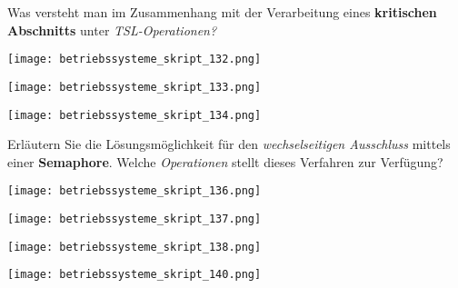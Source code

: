 \documentclass{article}
\begin{document}
\begin{tcolorbox}[colback=white!10!white,colframe=lightgray!75!black,
  savelowerto=\jobname_ex.tex,breakable,enhanced,lines before break=40]

\justifying
Was versteht man im Zusammenhang mit der Verarbeitung eines \textbf{kritischen Abschnitts} unter \textit{TSL-Operationen?}

\tcblower

\justifying
\begin{center}
\texttt{[image: betriebssysteme\_skript\_132.png]}
\end{center}
\begin{center}
\texttt{[image: betriebssysteme\_skript\_133.png]}
\end{center}
\begin{center}
\texttt{[image: betriebssysteme\_skript\_134.png]}
\end{center}

\end{tcolorbox}
\begin{tcolorbox}[colback=white!10!white,colframe=lightgray!75!black,
  savelowerto=\jobname_ex.tex,breakable,enhanced,lines before break=40]

\justifying
Erläutern Sie die Lösungsmöglichkeit für den \textit{wechselseitigen Ausschluss} mittels einer \textbf{Semaphore}. Welche \textit{Operationen} stellt dieses Verfahren zur Verfügung?

\tcblower

\justifying
\begin{center}
\texttt{[image: betriebssysteme\_skript\_136.png]}
\end{center}
\begin{center}
\texttt{[image: betriebssysteme\_skript\_137.png]}
\end{center}
\begin{center}
\texttt{[image: betriebssysteme\_skript\_138.png]}
\end{center}
\begin{center}
\texttt{[image: betriebssysteme\_skript\_140.png]}
\end{center}

\end{tcolorbox}
\end{document}

